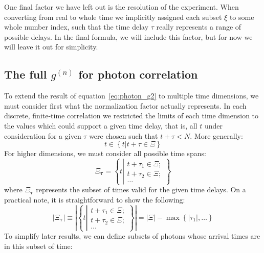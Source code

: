 \documentclass{article}
\newcommand{\braces}[1]{\ensuremath{\left\lbrace #1 \right\rbrace}}
\newcommand{\setbuilder}[2]{\ensuremath{\braces{#1 \left| #2 \right.}}}
\newcommand{\gn}[1]{\ensuremath{g^{(#1)}}}
\renewcommand{\vec}{\boldsymbol}
\newcommand{\abs}[1]{\ensuremath{\left|#1\right|}}
\newcommand{\integrationtime}{\ensuremath{\Xi}}
\newcommand{\timewindow}{\ensuremath{\xi}}
\begin{document}
One final factor we have left out is the resolution of the experiment. When converting from real to whole time we implicitly assigned each subset $\timewindow$ to some whole number index, such that the time delay $\tau$ really represents a range of possible delays. In the final formula, we will include this factor, but for now we will leave it out for simplicity.

\subsection{The full \gn{n} for photon correlation}
To extend the result of equation~\ref{eq:photon_g2} to multiple time dimensions, we must consider first what the normalization factor actually represents. In each discrete, finite-time correlation we restricted the limits of each time dimension to the values which could support a given time delay, that is, all $t$ under consideration for a given $\tau$ were chosen such that $t+\tau <N$. More generally:
\begin{equation}
t\in\setbuilder{t}{t+\tau\in\integrationtime}
\end{equation}
For higher dimensions, we must consider all possible time spans:
\begin{equation}
\label{eq:allowed_time_size}
\integrationtime_{\vec{\tau}} = 
     \setbuilder{t}{\begin{aligned}
                   t+\tau_{1}\in\integrationtime; \\
                   t+\tau_{2}\in\integrationtime; \\
                   \ldots
                   \end{aligned}}
\end{equation}
where $\integrationtime_{\vec{\tau}}$ represents the subset of times valid for the given time delays. On a practical note, it is straightforward to show the following:
\begin{equation}
\abs{\integrationtime_{\vec{\tau}}}
   \equiv\abs{\setbuilder{t}{\begin{aligned}
                   t+\tau_{1}\in\integrationtime; \\
                   t+\tau_{2}\in\integrationtime; \\
                   \ldots
                   \end{aligned}}}
   = \abs{\integrationtime} - \max{\braces{\abs{\tau_{1}},\ldots}}
\end{equation}
To simplify later results, we can define subsets of photons whose arrival times are in this subset of time:
\end{document}
